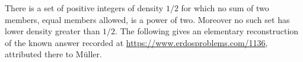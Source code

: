 There is a set of positive integers of density \(1/2\) for which no sum of two members, equal members allowed, is a power of two. Moreover no such set has lower density greater than \(1/2\). The following gives an elementary reconstruction of the known answer recorded at \url{https://www.erdosproblems.com/1136}, attributed there to M\"uller.
